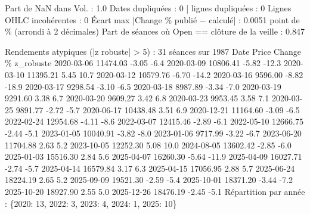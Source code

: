 \documentclass[
  10pt,
]{article}
\newenvironment{Shaded}{}{}
\newcommand{\NormalTok}[1]{#1}
\begin{document}
\begin{Shaded}
\begin{Highlighting}[]
\NormalTok{Part de NaN dans Vol. : 1.0}
\NormalTok{Dates dupliquées : 0 | lignes dupliquées : 0}
\NormalTok{Lignes OHLC incohérentes : 0}
\NormalTok{Écart max |Change \% publié − calculé| : 0.0051 point de \%  (arrondi à 2 décimales)}
\NormalTok{Part de séances où Open == clôture de la veille : 0.847}

\NormalTok{Rendements atypiques (|z robuste| \textgreater{} 5) : 31 séances sur 1987}
\NormalTok{      Date    Price  Change \%  z\_robuste}
\NormalTok{2020{-}03{-}06 11474.03     {-}3.05       {-}6.4}
\NormalTok{2020{-}03{-}09 10806.41     {-}5.82      {-}12.3}
\NormalTok{2020{-}03{-}10 11395.21      5.45       10.7}
\NormalTok{2020{-}03{-}12 10579.76     {-}6.70      {-}14.2}
\NormalTok{2020{-}03{-}16  9596.00     {-}8.82      {-}18.9}
\NormalTok{2020{-}03{-}17  9298.54     {-}3.10       {-}6.5}
\NormalTok{2020{-}03{-}18  8987.89     {-}3.34       {-}7.0}
\NormalTok{2020{-}03{-}19  9291.60      3.38        6.7}
\NormalTok{2020{-}03{-}20  9609.27      3.42        6.8}
\NormalTok{2020{-}03{-}23  9953.45      3.58        7.1}
\NormalTok{2020{-}03{-}25  9891.77     {-}2.72       {-}5.7}
\NormalTok{2020{-}06{-}17 10438.48      3.51        6.9}
\NormalTok{2020{-}12{-}21 11164.60     {-}3.09       {-}6.5}
\NormalTok{2022{-}02{-}24 12954.68     {-}4.11       {-}8.6}
\NormalTok{2022{-}03{-}07 12415.46     {-}2.89       {-}6.1}
\NormalTok{2022{-}05{-}10 12666.75     {-}2.44       {-}5.1}
\NormalTok{2023{-}01{-}05 10040.91     {-}3.82       {-}8.0}
\NormalTok{2023{-}01{-}06  9717.99     {-}3.22       {-}6.7}
\NormalTok{2023{-}06{-}20 11704.88      2.63        5.2}
\NormalTok{2023{-}10{-}05 12252.30      5.08       10.0}
\NormalTok{2024{-}08{-}05 13602.42     {-}2.85       {-}6.0}
\NormalTok{2025{-}01{-}03 15516.30      2.84        5.6}
\NormalTok{2025{-}04{-}07 16260.30     {-}5.64      {-}11.9}
\NormalTok{2025{-}04{-}09 16027.71     {-}2.74       {-}5.7}
\NormalTok{2025{-}04{-}14 16579.84      3.17        6.3}
\NormalTok{2025{-}04{-}15 17056.95      2.88        5.7}
\NormalTok{2025{-}06{-}24 18224.19      2.65        5.2}
\NormalTok{2025{-}09{-}09 19521.30     {-}2.59       {-}5.4}
\NormalTok{2025{-}10{-}01 18371.20     {-}3.44       {-}7.2}
\NormalTok{2025{-}10{-}20 18927.90      2.55        5.0}
\NormalTok{2025{-}12{-}26 18476.19     {-}2.45       {-}5.1}
\NormalTok{Répartition par année : \{2020: 13, 2022: 3, 2023: 4, 2024: 1, 2025: 10\}}
\end{Highlighting}
\end{Shaded}
\end{document}
